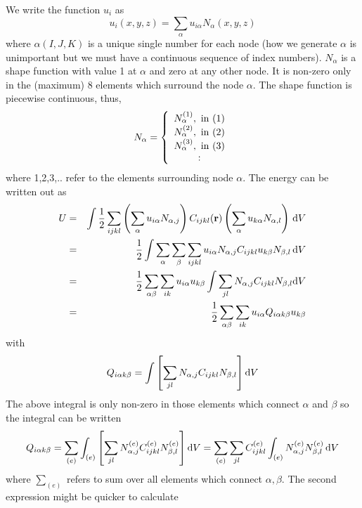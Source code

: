 \documentclass[a4paper]{article}
\begin{document}
We write the function $u_i$ as
\begin{equation}
  u_i(x,y,z)=\sum_\alpha u_{i\alpha} N_\alpha(x,y,z)
  \label{uxyz}
\end{equation}
where $\alpha(I,J,K)$ is a unique single number for each node (how we
generate $\alpha$ is unimportant but we must have a continuous sequence
of index numbers). $N_\alpha$ is a shape function with value 1 at
$\alpha$ and zero at any other node. It is non-zero only in the (maximum) 8
elements which surround the node $\alpha$. The shape function is
piecewise continuous, thus,
\begin{equation}
  N_\alpha=\left\{
  \begin{array}{c}
    N_\alpha^{(1)},~\mathrm{in}~(1)\\
    N_\alpha^{(2)},~\mathrm{in}~(2)\\
    N_\alpha^{(3)},~\mathrm{in}~(3)\\
    :
  \end{array}\right.
\end{equation}
where 1,2,3,.. refer to the elements surrounding node $\alpha$. The
energy  can be written out as
\begin{eqnarray}
  U&=&\int \frac12 \sum_{ijkl}\left(\sum_\alpha u_{i\alpha}N_{\alpha,j}\right) 
C_{ijkl}(\mathbf{r})
  \left(\sum_\alpha u_{k\alpha}N_{\alpha,l}\right)\,\mathrm{d} V\\
&=&\frac12\int \sum_\alpha\sum_\beta\sum_{ijkl} u_{i\alpha}N_{\alpha,j}
C_{ijkl} u_{k\beta}N_{\beta,l}\,\mathrm{d} V\\
&=&\frac12 \sum_{\alpha\beta}\sum_{ik} u_{i\alpha}u_{k\beta}
\int \sum_{jl} N_{\alpha,j} C_{ijkl} N_{\beta,l}\mathrm{d} V\\
&=&\frac12\sum_{\alpha\beta}\sum_{ik} 
u_{i\alpha}Q_{i\alpha k\beta}u_{k\beta}
\end{eqnarray}
with
\begin{equation}
  Q_{i\alpha k\beta}=\int \left[\sum_{jl} N_{\alpha,j} C_{ijkl} N_{\beta,l}\right]\mathrm{d} V
\end{equation}
The above integral is only non-zero in those elements which connect
$\alpha$ and $\beta$ so the integral can be written
\begin{equation}
  Q_{i\alpha k\beta}=\sum_{(e)}\int_{(e)} \left[\sum_{jl} 
N_{\alpha,j}^{(e)} C_{ijkl}^{(e)} N_{\beta,l}^{(e)}\right]\mathrm{d} V=
\sum_{(e)}\sum_{jl}C_{ijkl}^{(e)}\int_{(e)} N_{\alpha,j}^{(e)}N_{\beta,l}^{(e)}
\,\mathrm{d} V
\end{equation}
where $\sum_{(e)}$ refers to sum over all elements which connect
$\alpha,\beta$. The second expression might be quicker to calculate
\end{document}
